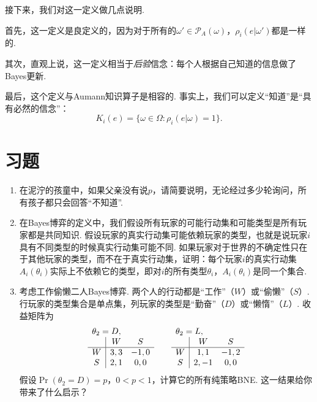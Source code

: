 接下来，我们对这一定义做几点说明. 

首先，这一定义是良定义的，因为对于所有的$\omega'\in\mathcal P_A(\omega)$，$\rho_i(e|\omega')$都是一样的.

其次，直观上说，这一定义相当于\textit{后验}信念：每个人根据自己知道的信息做了Bayes更新.

最后，这个定义与Aumann知识算子是相容的. 事实上，我们可以定义“知道”是“具有必然的信念”：
\[K_i(e)=\{\omega\in\Omega:\rho_i(e|\omega) = 1\}.\]

\section{习题}

\begin{enumerate}[wide, labelindent=0pt]
    \item \label{exercise:muddy-children-no-p} 在泥泞的孩童中，如果父亲没有说$p$，请简要说明，无论经过多少轮询问，所有孩子都只会回答“不知道”.
    
    \item 在Bayes博弈的定义中，我们假设所有玩家的可能行动集和可能类型是所有玩家都是共同知识. 假设玩家的真实行动集可能依赖玩家的类型，也就是说玩家$i$具有不同类型的时候真实行动集可能不同. 如果玩家对于世界的不确定性只在于其他玩家的类型，而不在于真实行动集，证明：每个玩家$i$的真实行动集$A_i(\theta_i)$实际上不依赖它的类型，即对$i$的所有类型$\theta_i$，$A_i(\theta_i)$是同一个集合.

    \item 考虑工作偷懒二人Bayes博弈. 两个人的行动都是“工作”（$W$）或“偷懒”（$S$）. 行玩家的类型集合是单点集，列玩家的类型是“勤奋”（$D$）或“懒惰”（$L$）. 收益矩阵为
    \[\begin{array}{c|cc}
        \multicolumn{3}{l}{\theta_2=D,}\\
         &W&S  \\\hline
         W&3,3&-1,0\\
         S&2,1&0,0\\
    \end{array}\qquad \begin{array}{c|cc}
        \multicolumn{3}{l}{\theta_2=L,}\\
         &W&S  \\\hline
         W&1,1&-1,2\\
         S&2,-1&0,0\\
    \end{array}\]
    假设$\Pr(\theta_2=D)=p$，$0<p<1$，计算它的所有纯策略BNE. 这一结果给你带来了什么启示？


\end{enumerate}
